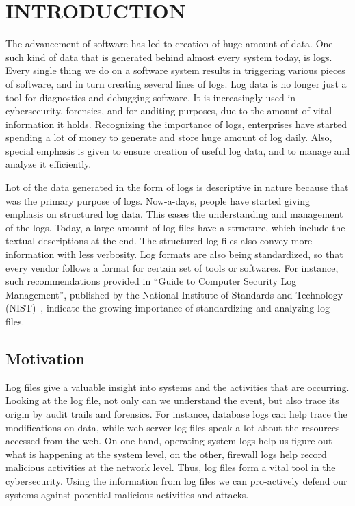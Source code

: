 \chapter{INTRODUCTION}
\thispagestyle{plain}

\label{Introduction}

The advancement of software has led to creation of huge amount of data. One such kind of data that is generated behind almost every system today, is logs. Every single thing we do on a software system results in triggering various pieces of software, and in turn creating several lines of logs. Log data is no longer just a tool for diagnostics and debugging software. It is increasingly used in cybersecurity, forensics, and for auditing purposes, due to the amount of vital information it holds. Recognizing the importance of logs, enterprises have started spending a lot of money to generate and store huge amount of log daily. Also, special emphasis is given to ensure creation of useful log data,  and to manage and analyze it efficiently.

Lot of the data generated in the form of logs is descriptive in nature because that was the primary purpose of logs. Now-a-days, people have started giving emphasis on structured log data. This eases the understanding and management of the logs. Today, a large amount of log files have a structure, which include the textual descriptions at the end. The structured log files also convey more information with less verbosity. Log formats are also being standardized, so that every vendor follows a format for certain set of tools or softwares. For instance, such recommendations provided in ``Guide to Computer Security Log Management'', published by the National Institute of Standards and Technology (NIST)~\cite{nist_guide}, indicate the growing importance of standardizing and analyzing log files.


\section{Motivation}

Log files give a valuable insight into systems and the activities that are occurring. Looking at the log file, not only can we understand the event, but also trace its origin by audit trails and forensics. For instance, database logs can help trace the modifications on data, while web server log files speak a lot about the resources accessed from the web. On one hand, operating system logs help us figure out what is happening at the system level, on the other, firewall logs help record malicious activities at the network level. Thus, log files form a vital tool in the cybersecurity. Using the information from log files we can pro-actively defend our systems against potential malicious activities and attacks.

